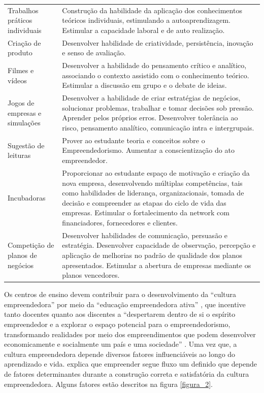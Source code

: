 \begin{longtable}{p{3.5cm}p{11.0cm}}
Trabalhos práticos individuais & Construção da habilidade da aplicação dos conhecimentos teóricos
individuais, estimulando a autoaprendizagem. Estimular a capacidade
laboral e de auto realização. \\ 

Criação de produto & Desenvolver habilidade de criatividade, persistência, inovação e senso de
avaliação. \\ 

Filmes e vídeos & Desenvolver a habilidade do pensamento crítico e analítico, associando o
contexto assistido com o conhecimento teórico. Estimular a discussão em grupo e o debate de ideias. \\ 

Jogos de empresas e simulações & Desenvolver a habilidade de criar estratégias de negócios, solucionar
problemas, trabalhar e tomar decisões sob pressão. Aprender pelos próprios erros. Desenvolver tolerância ao risco, pensamento analítico, comunicação intra e intergrupais. \\ 

Sugestão de leituras & Prover ao estudante teoria e conceitos sobre o Empreendedorismo. Aumentar a conscientização do ato empreendedor. \\ 
Incubadoras & Proporcionar ao estudante espaço de motivação e criação da nova empresa, desenvolvendo múltiplas competências, tais como habilidades de liderança, organizacionais, tomada de decisão e compreender as etapas do ciclo de vida das empresas. Estimular o fortalecimento da network com financiadores, fornecedores e clientes. \\

Competição de planos de negócios & Desenvolver habilidades de comunicação, persuasão e estratégia.
Desenvolver capacidade de observação, percepção e aplicação de melhorias no padrão de qualidade dos planos apresentados. Estimular a abertura de empresas mediante os planos vencedores. \\ 

\end{longtable}


Os centros de ensino devem contribuir para o desenvolvimento da “cultura empreendedora” por meio da “educação empreendedora ativa” \cite{tscha_empreendendo_2014}, que incentive tanto docentes quanto aos discentes a “despertarem dentro de si o espírito empreendedor e a explorar o espaço potencial para o empreendedorismo, transformando realidades por meio dos empreendimentos que podem desenvolver economicamente e socialmente um país e uma sociedade” \cite{tscha_empreendendo_2014}. Uma vez que, a cultura empreendedora depende diversos fatores influenciáveis ao longo do aprendizado e vida. \cite{dornelas_empreendedorismo_2005} explica que  empreender segue fluxo um definido que depende de fatores determinantes durante a construção correta e satisfatória da cultura empreendedora. Alguns fatores estão descritos na figura \ref{figura_2}.

